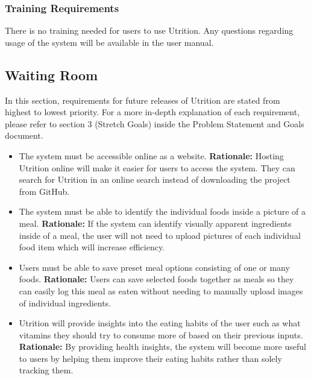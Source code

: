 \documentclass[12pt]{article}
\newcounter{FRCounter}
\newcommand{\FillFRNumber}{\textbf{FR\arabic{FRCounter}.} \stepcounter{FRCounter}}
\begin{document}
{\subsubsection{Training Requirements}
There is no training needed for users to use Utrition. Any questions regarding usage of the system will be available in the user manual.

\subsection{Waiting Room}
In this section, requirements for future releases of Utrition are stated from highest to lowest priority. For a more in-depth explanation of each requirement, please refer to section 3 (Stretch Goals) inside the Problem Statement and Goals document.

\begin{itemize}
	\item [\FillFRNumber] The system must be accessible online as a website.\newline
	\textbf{Rationale:} Hosting Utrition online will make it easier for users to access the system. They can search for Utrition in an online search instead of downloading the project from GitHub.
	
	\item [\FillFRNumber] The system must be able to identify the individual foods inside a picture of a meal.\newline
	\textbf{Rationale:} If the system can identify visually apparent ingredients inside of a meal, the user will not need to upload pictures of each individual food item which will increase efficiency.
	
	\item [\FillFRNumber] Users must be able to save preset meal options consisting of one or many foods.\newline
	\textbf{Rationale:} Users can save selected foods together as meals so they can easily log this meal as eaten without needing to manually upload images of individual ingredients.
	
	\item [\FillFRNumber] Utrition will provide insights into the eating habits of the user such as what vitamins they should try to consume more of based on their previous inputs.\newline
	\textbf{Rationale:} By providing health insights, the system will become more useful to users by helping them improve their eating habits rather than solely tracking them.
	

\end{itemize}}
\end{document}
